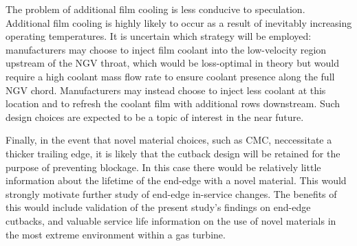 \documentclass[a4paper, 11pt, oneside]{report}
\begin{document}
The problem of additional film cooling is less conducive to speculation. Additional film cooling is highly likely to occur as a result of inevitably increasing operating temperatures. It is uncertain which strategy will be employed: manufacturers may choose to inject film coolant into the low-velocity region upstream of the NGV throat, which would be loss-optimal in theory but would require a high coolant mass flow rate to ensure coolant presence along the full NGV chord. Manufacturers may instead choose to inject less coolant at this location and to refresh the coolant film with additional rows downstream. Such design choices are expected to be a topic of interest in the near future. 

\newpage
Finally, in the event that novel material choices, such as CMC, neccessitate a thicker trailing edge, it is likely that the cutback design will be retained for the purpose of preventing blockage. In this case there would be relatively little information about the lifetime of the end-edge with a novel material. This would strongly motivate further study of end-edge in-service changes. The benefits of this would include validation of the present study's findings on end-edge cutbacks, and valuable service life information on the use of novel materials in the most extreme environment within a gas turbine.





\end{document}
